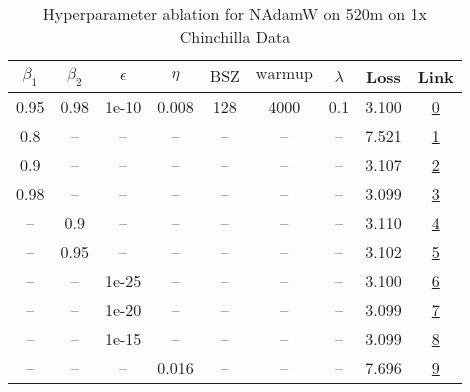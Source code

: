 \begin{table}[H]
\centering
\caption{Hyperparameter ablation for NAdamW on 520m on 1x Chinchilla Data}
\label{tab:ablation_nadamw_520m_1}
\begin{tabular}{ccccccccc}
\toprule
$\beta_1$ & $\beta_2$ & $\epsilon$ & $\eta$ & $\mathrm{BSZ}$ & $\mathrm{warmup}$ & $\lambda$ & Loss & Link \\
\midrule
0.95 & 0.98 & 1e-10 & 0.008 & 128 & 4000 & 0.1 & 3.100 & \href{https://wandb.ai/stanford-mercury/optimizer-scaling/runs/sweep-520m-10B-nadamwd3819dlr0.008-wd0.1-minlr0-warmup4000-b10.9-b6c23d}{0} \\
\midrule
0.8 & -- & -- & -- & -- & -- & -- & 7.521 & \href{https://wandb.ai/stanford-mercury/optimizer-scaling/runs/sweep-520m-10B-nadamw953b59lr0.008-wd0.1-minlr0-warmup4000-b10.8-eecfd9}{1} \\
0.9 & -- & -- & -- & -- & -- & -- & 3.107 & \href{https://wandb.ai/stanford-mercury/optimizer-scaling/runs/sweep-520m-10B-nadamwf7d93blr0.008-wd0.1-minlr0-warmup4000-b10.9-8cc26c}{2} \\
0.98 & -- & -- & -- & -- & -- & -- & 3.099 & \href{https://wandb.ai/stanford-mercury/optimizer-scaling/runs/sweep-520m-10B-nadamwtf0f005lr0.008-wd0.1-minlr0-warmup4000-b10.-24ef29}{3} \\
-- & 0.9 & -- & -- & -- & -- & -- & 3.110 & \href{https://wandb.ai/stanford-mercury/optimizer-scaling/runs/sweep-520m-10B-nadamw43143dlr0.008-wd0.1-minlr0-warmup4000-b10.9-841910}{4} \\
-- & 0.95 & -- & -- & -- & -- & -- & 3.102 & \href{https://wandb.ai/stanford-mercury/optimizer-scaling/runs/sweep-520m-10B-nadamw45f002lr0.008-wd0.1-minlr0-warmup4000-b10.9-e681c9}{5} \\
-- & -- & 1e-25 & -- & -- & -- & -- & 3.100 & \href{https://wandb.ai/stanford-mercury/optimizer-scaling/runs/sweep-520m-10B-nadamwc7bf40lr0.008-wd0.1-minlr0-warmup4000-b10.9-81d083}{6} \\
-- & -- & 1e-20 & -- & -- & -- & -- & 3.099 & \href{https://wandb.ai/stanford-mercury/optimizer-scaling/runs/sweep-520m-10B-nadamwd272c6lr0.008-wd0.1-minlr0-warmup4000-b10.9-77775a}{7} \\
-- & -- & 1e-15 & -- & -- & -- & -- & 3.099 & \href{https://wandb.ai/stanford-mercury/optimizer-scaling/runs/sweep-520m-10B-nadamw0661a1lr0.008-wd0.1-minlr0-warmup4000-b10.9-ee2277}{8} \\
-- & -- & -- & 0.016 & -- & -- & -- & 7.696 & \href{https://wandb.ai/stanford-mercury/optimizer-scaling/runs/sweep-520m-10B-nadamw337e3dlr0.016-wd0.1-minlr0-warmup4000-b10.9-139e8e}{9} \\

\end{tabular}
\end{table}
